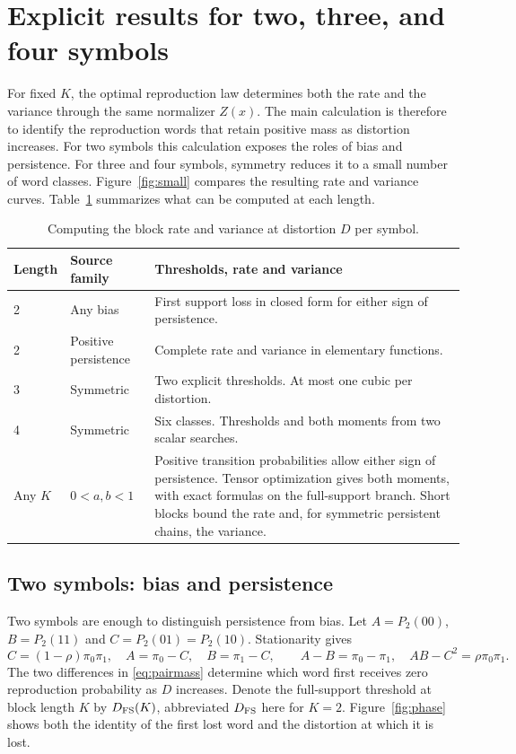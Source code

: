 \documentclass[11pt,letterpaper]{article}
\theoremstyle{definition}
\begin{document}
\section{Explicit results for two, three, and four symbols}\label{sec:two}
For fixed $K$, the optimal reproduction law determines both the rate and the variance through the same normalizer $Z(x)$. The main calculation is therefore to identify the reproduction words that retain positive mass as distortion increases. For two symbols this calculation exposes the roles of bias and persistence. For three and four symbols, symmetry reduces it to a small number of word classes. Figure~\ref{fig:small} compares the resulting rate and variance curves.
Table~\ref{tab:roadmap} summarizes what can be computed at each length.
\begin{table}[htbp]\centering\small
\caption{Computing the block rate and variance at distortion $D$ per symbol.}
\label{tab:roadmap}\begin{tabularx}{\linewidth}{@{}l l X@{}}\toprule
Length & Source family & Thresholds, rate and variance\\\midrule
2 & Any bias & First support loss in closed form for either sign of persistence.\\
2 & Positive persistence & Complete rate and variance in elementary functions.\\
3 & Symmetric & Two explicit thresholds. At most one cubic per distortion.\\
4 & Symmetric & Six classes. Thresholds and both moments from two scalar searches.\\
Any $K$ & $0<a,b<1$ & Positive transition probabilities allow either sign of persistence. Tensor optimization gives both moments, with exact formulas on the full-support branch. Short blocks bound the rate and, for symmetric persistent chains, the variance.\\\bottomrule
\end{tabularx}
\end{table}
\subsection{Two symbols: bias and persistence}
Two symbols are enough to distinguish persistence from bias. Let $A=P_2(00)$, $B=P_2(11)$ and $C=P_2(01)=P_2(10)$. Stationarity gives
\begin{equation}
 C=(1-\rho)\pi_0\pi_1,\quad A=\pi_0-C,\quad B=\pi_1-C,\qquad
 A-B=\pi_0-\pi_1,\quad AB-C^2=\rho\pi_0\pi_1 .                 \label{eq:pairmass}
\end{equation}
The two differences in \eqref{eq:pairmass} determine which word first receives zero reproduction probability as $D$ increases. Denote the full-support threshold at block length $K$ by $D_{\rm FS}(K)$, abbreviated $D_{\rm FS}$ here for $K=2$. Figure~\ref{fig:phase} shows both the identity of the first lost word and the distortion at which it is lost.
\end{document}
